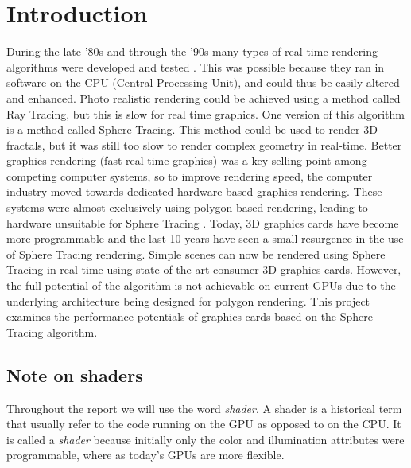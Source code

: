 \chapter{Introduction} 	

	During the late '80s and through the '90s many types of real time rendering
	algorithms were developed and tested \cite{Hart1989}. This was possible
	because they ran in software on the	CPU (Central Processing Unit), and could
	thus be easily altered and enhanced. Photo realistic rendering could be
	achieved using a method called Ray Tracing, but this is slow for real time
	graphics\cite{PeterShirleyMichaelAshikhmin2005}. One version of this
	algorithm is a method called Sphere Tracing. This method could be used to render 3D
	fractals\cite{Hart1989}, but it was	still too slow to render complex geometry
	in real-time\cite{Hart1989}. Better graphics rendering (fast real-time
																													graphics) was a key
	selling point among competing computer systems, so to improve rendering
	speed, the computer industry moved towards dedicated hardware based graphics
	rendering\cite{Houston2010}. These systems were almost exclusively using
	polygon-based	rendering, leading to hardware unsuitable for Sphere Tracing
	. Today, 3D graphics cards have become more programmable and the
	last 10 years have seen a small resurgence in the use of Sphere Tracing
	rendering\cite{InigoQuilez}. Simple scenes can now be rendered using Sphere
	Tracing in real-time using state-of-the-art consumer 3D graphics cards.
	However, the full potential of the algorithm is not achievable on current
	GPUs due to the underlying architecture being designed for polygon
	rendering\cite{Houston2010}. This project examines the performance
	potentials of graphics cards based on the Sphere Tracing algorithm.

	\section{Note on shaders} 
		
		Throughout the report we will use the word \emph{shader}. A shader is a
		historical term that usually refer to the code running on the GPU as
		opposed to on the CPU. It is called a \emph{shader} because initially only
		the color and illumination attributes were programmable, where as today's
		GPUs are more flexible. 

